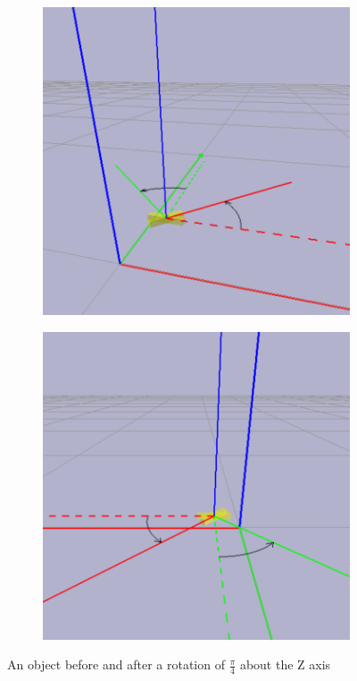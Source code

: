 \begin{figure}[h]
    \centering
    \begin{subfigure}[b]{0.45\textwidth}
        \includegraphics[width=\textwidth]{figures/coordinate_figure1.png}
    \end{subfigure}
    \hfill
    \begin{subfigure}[b]{0.45\textwidth}
        \includegraphics[width=\textwidth]{figures/coordinate_figure2.png}
    \end{subfigure}
    \caption[An object before and after a rotation of $\frac{\pi}{4}$ about the Z axis]{An object before and after a rotation of $\frac{\pi}{4}$ about the Z axis \footnotemark}
    \label{fig:orientations}
\end{figure}
